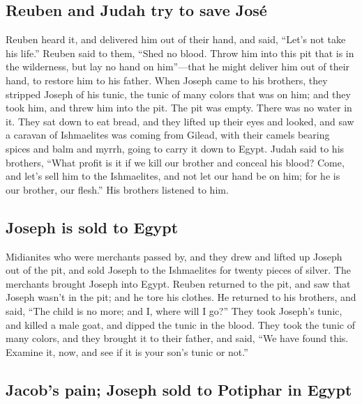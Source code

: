 \begin{paracol}{2}
\begin{otherlanguage}{english}
\hypertarget{reuben-and-judah-try-to-save-josuxe9}{%
\subsection{Reuben and Judah try to save
José}\label{reuben-and-judah-try-to-save-josuxe9}}

 Reuben heard it, and delivered him out of their hand,
and said, ``Let's not take his life.''  Reuben said to
them, ``Shed no blood. Throw him into this pit that is in the
wilderness, but lay no hand on him''---that he might deliver him out of
their hand, to restore him to his father.  When Joseph
came to his brothers, they stripped Joseph of his tunic, the tunic of
many colors that was on him;  and they took him, and
threw him into the pit. The pit was empty. There was no water in it.
 They sat down to eat bread, and they lifted up their
eyes and looked, and saw a caravan of Ishmaelites was coming from
Gilead, with their camels bearing spices and balm and myrrh, going to
carry it down to Egypt.  Judah said to his brothers,
``What profit is it if we kill our brother and conceal his blood?
 Come, and let's sell him to the Ishmaelites, and not let
our hand be on him; for he is our brother, our flesh.'' His brothers
listened to him.

\hypertarget{joseph-is-sold-to-egypt}{%
\subsection{Joseph is sold to Egypt}\label{joseph-is-sold-to-egypt}}

 Midianites who were merchants passed by, and they drew
and lifted up Joseph out of the pit, and sold Joseph to the Ishmaelites
for twenty pieces of silver. The merchants brought Joseph into Egypt.
 Reuben returned to the pit, and saw that Joseph wasn't
in the pit; and he tore his clothes.  He returned to his
brothers, and said, ``The child is no more; and I, where will I go?''
 They took Joseph's tunic, and killed a male goat, and
dipped the tunic in the blood.  They took the tunic of
many colors, and they brought it to their father, and said, ``We have
found this. Examine it, now, and see if it is your son's tunic or not.''

\hypertarget{jacobs-pain-joseph-sold-to-potiphar-in-egypt}{%
\subsection{Jacob's pain; Joseph sold to Potiphar in
Egypt}\label{jacobs-pain-joseph-sold-to-potiphar-in-egypt}}


\end{otherlanguage}
\end{paracol}
